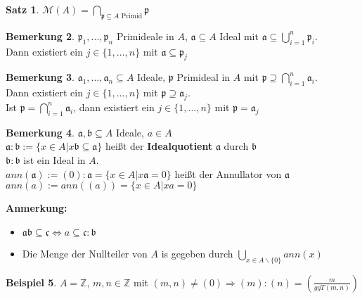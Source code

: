 \documentclass[10pt,a4paper,numbers=endperiod]{scrreprt}
\theoremstyle{definition}
\newtheorem{satz}{Satz}[section]
\newtheorem{bem}[satz]{Bemerkung}
\newtheorem{bsp}[satz]{Beispiel}
\def\ZZ{{\mathbb Z}}
\begin{document}
\begin{satz}
	$\mathcal{M}(A) = \bigcap\limits_{\mathfrak{p} \subseteq A \text{ Primid}} \mathfrak{p}$
\end{satz}

\begin{bem}
	$\mathfrak{p}_1, \ldots, \mathfrak{p}_n$ Primideale in $A$, $\mathfrak{a} \subseteq A$ Ideal mit $\mathfrak{a} \subseteq \bigcup\limits_{i = 1}^n \mathfrak{p}_i$.\\
	Dann existiert ein $j \in \{1, \ldots, n\}$ mit $\mathfrak{a} \subseteq \mathfrak{p}_j$
\end{bem}

\begin{bem}
	$\mathfrak{a}_1, \ldots, \mathfrak{a}_n \subseteq A$ Ideale, $\mathfrak{p}$ Primideal in $A$ mit $\mathfrak{p} \supseteq \bigcap\limits_{i = 1}^n \mathfrak{a}_i$.\\
	Dann existiert ein $j \in \{1, \ldots, n\}$ mit $\mathfrak{p} \supseteq \mathfrak{a}_j$.\\
	Ist $\mathfrak{p} = \bigcap\limits_{i = 1}^n \mathfrak{a}_i$, dann existiert ein $j \in \{1, \ldots, n\}$ mit $\mathfrak{p} = \mathfrak{a}_j$
\end{bem}

\begin{bem}
	$\mathfrak{a}, \mathfrak{b} \subseteq A$ Ideale, $a \in A$\\
	$\mathfrak{a}: \mathfrak{b} := \{ x \in A| x \mathfrak{b} \subseteq \mathfrak{a}\}$ heißt der \textbf{Idealquotient} $\mathfrak{a}$ durch $\mathfrak{b}$\\
	$\mathfrak{b} : \mathfrak{b}$ ist ein Ideal in $A$.\\
	$ann(\mathfrak{a}) := (0): \mathfrak{a} = \{x \in A| x \mathfrak{a} = 0\}$ heißt der Annullator von $\mathfrak{a}$\\
	$ann(a) := ann((a)) = \{x \in A| xa = 0\}$
\end{bem}

\textbf{Anmerkung:} \begin{itemize}
	\item $\mathfrak{a} \mathfrak{b} \subseteq \mathfrak{c} \Leftrightarrow a \subseteq \mathfrak{c} : \mathfrak{b}$
	\item Die Menge der Nullteiler von $A$ is gegeben durch $\bigcup\limits_{x \in A \backslash
	 \{0\}} ann(x)$
\end{itemize}

\begin{bsp}
	$A = \ZZ$, $m,n \in \ZZ$ mit $(m,n) \neq (0) \Rightarrow (m):(n) = (\frac{m}{ggT(m,n)})$ 
\end{bsp}
\end{document}
